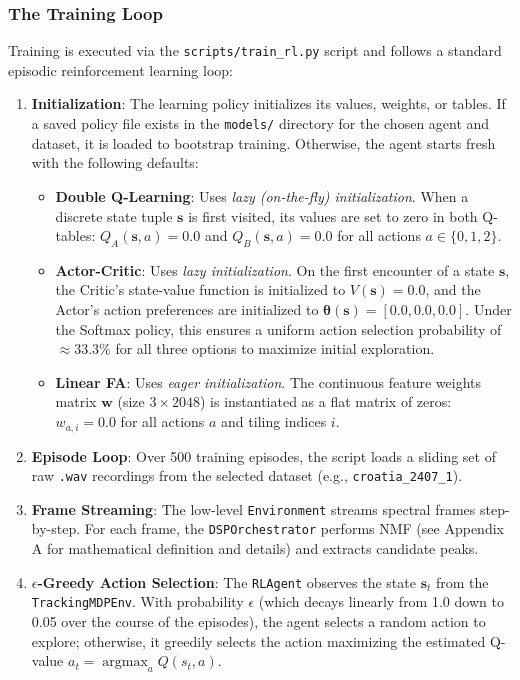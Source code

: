 \documentclass[12pt,a4paper]{article}
\begin{document}
\subsubsection{The Training Loop}
Training is executed via the \texttt{scripts/train\_rl.py} script and follows a standard episodic reinforcement learning loop:
\begin{enumerate}
    \item \textbf{Initialization}: The learning policy initializes its values, weights, or tables. If a saved policy file exists in the \texttt{models/} directory for the chosen agent and dataset, it is loaded to bootstrap training. Otherwise, the agent starts fresh with the following defaults:
    \begin{itemize}
        \item \textbf{Double Q-Learning}: Uses \textit{lazy (on-the-fly) initialization}. When a discrete state tuple $\mathbf{s}$ is first visited, its values are set to zero in both Q-tables: $Q_A(\mathbf{s}, a) = 0.0$ and $Q_B(\mathbf{s}, a) = 0.0$ for all actions $a \in \{0, 1, 2\}$.
        \item \textbf{Actor-Critic}: Uses \textit{lazy initialization}. On the first encounter of a state $\mathbf{s}$, the Critic's state-value function is initialized to $V(\mathbf{s}) = 0.0$, and the Actor's action preferences are initialized to $\boldsymbol{\theta}(\mathbf{s}) = [0.0, 0.0, 0.0]$. Under the Softmax policy, this ensures a uniform action selection probability of $\approx 33.3\%$ for all three options to maximize initial exploration.
        \item \textbf{Linear FA}: Uses \textit{eager initialization}. The continuous feature weights matrix $\mathbf{w}$ (size $3 \times 2048$) is instantiated as a flat matrix of zeros: $w_{a, i} = 0.0$ for all actions $a$ and tiling indices $i$.
    \end{itemize}
    \item \textbf{Episode Loop}: Over 500 training episodes, the script loads a sliding set of raw \texttt{.wav} recordings from the selected dataset (e.g., \texttt{croatia\_2407\_1}).
    \item \textbf{Frame Streaming}: The low-level \texttt{Environment} streams spectral frames step-by-step. For each frame, the \texttt{DSPOrchestrator} performs NMF (see Appendix A for mathematical definition and details) and extracts candidate peaks.
    \item \textbf{$\epsilon$-Greedy Action Selection}: The \texttt{RLAgent} observes the state $\mathbf{s}_t$ from the \texttt{TrackingMDPEnv}. With probability $\epsilon$ (which decays linearly from 1.0 down to 0.05 over the course of the episodes), the agent selects a random action to explore; otherwise, it greedily selects the action maximizing the estimated Q-value $a_t = \operatorname{argmax}_a Q(s_t, a)$.

\end{enumerate}
\end{document}
